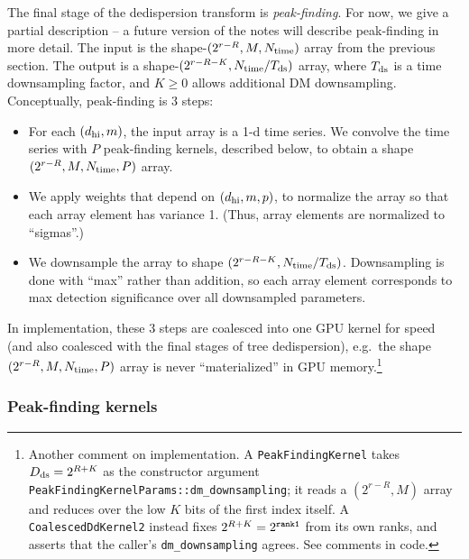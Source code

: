 \documentclass{article}
\numberwithin{equation}{section}   %
\begin{document}
The final stage of the dedispersion transform is {\em peak-finding}.
For now, we give a partial description -- a future version of the notes will describe
peak-finding in more detail.
The input is the shape-$(2^{r-R}, M, N_{\rm time})$ array from the previous section.
The output is a shape-$(2^{r-R-K}, N_{\rm time}/T_{\rm ds})$ array, where $T_{\rm ds}$ 
is a time downsampling factor, and $K\ge 0$ allows additional DM downsampling.
Conceptually, peak-finding is 3 steps:
\begin{itemize}
\item For each $(d_{\rm hi}, m)$, the input array is a 1-d time series.
We convolve the time series with $P$ peak-finding kernels, described below, to
obtain a shape $(2^{r-R}, M, N_{\rm time}, P)$ array.
\item We apply weights that depend on $(d_{\rm hi}, m, p)$, to normalize the array 
so that each array element has variance 1. (Thus, array elements are normalized to
``sigmas''.)
\item We downsample the array to shape $(2^{r-R-K}, N_{\rm time}/T_{\rm ds})$.
Downsampling is done with ``max'' rather than addition, so each array element
corresponds to max detection significance over all downsampled parameters.
\end{itemize}
In implementation, these 3 steps are coalesced into one GPU kernel for speed (and also
coalesced with the final stages of tree dedispersion), e.g.\ the shape $(2^{r-R}, M, N_{\rm time}, P)$
array is never ``materialized'' in GPU memory.\footnote{Another comment on implementation. A
{\tt PeakFindingKernel} takes $D_{\rm ds} = 2^{R+K}$ as the constructor argument
{\tt PeakFindingKernelParams::dm\_downsampling}; it reads a $(2^{r-R}, M)$ array and reduces
over the low $K$ bits of the first index itself. A {\tt CoalescedDdKernel2} instead fixes
$2^{R+K} = 2^{\tt rank1}$ from its own ranks, and asserts that the caller's
{\tt dm\_downsampling} agrees. See comments in code.}

\subsubsection{Peak-finding kernels}
\end{document}
